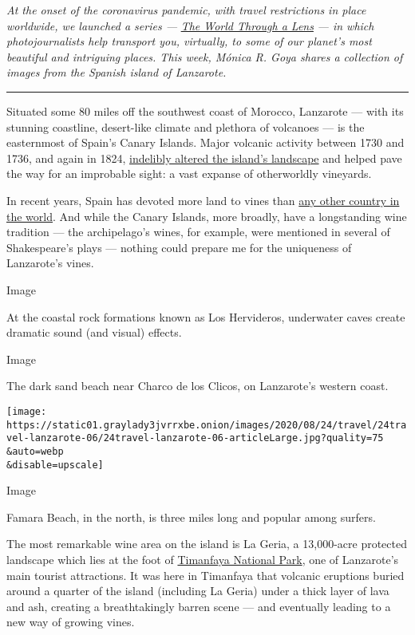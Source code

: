 \emph{At the onset of the coronavirus pandemic, with travel restrictions
in place worldwide, we launched a series ---}
\href{https://www.nytimes3xbfgragh.onion/column/the-world-through-a-lens}{\emph{The
World Through a Lens}} \emph{--- in which photojournalists help
transport you, virtually, to some of our planet's most beautiful and
intriguing places. This week, Mónica R. Goya shares a collection of
images from the Spanish island of Lanzarote.}

\begin{center}\rule{0.5\linewidth}{\linethickness}\end{center}

Situated some 80 miles off the southwest coast of Morocco, Lanzarote ---
with its stunning coastline, desert-like climate and plethora of
volcanoes --- is the easternmost of Spain's Canary Islands. Major
volcanic activity between 1730 and 1736, and again in 1824,
\href{http://volcano.oregonstate.edu/lanzarote\#:~:text=Lanzarote\%2C\%20a\%20shield\%20volcano\%20made,are\%20near\%20Montanas\%20del\%20Fuego.}{indelibly
altered the island's landscape} and helped pave the way for an
improbable sight: a vast expanse of otherworldly vineyards.

In recent years, Spain has devoted more land to vines than
\href{https://www.foodswinesfromspain.com/spanishfoodwine/wcm/idc/groups/public/documents/documento_anexo/mde3/nzcw/~edisp/dax2017770176.pdf}{any
other country in the world}. And while the Canary Islands, more broadly,
have a longstanding wine tradition --- the archipelago's wines, for
example, were mentioned in several of Shakespeare's plays --- nothing
could prepare me for the uniqueness of Lanzarote's vines.

Image

At the coastal rock formations known as Los Hervideros, underwater caves
create dramatic sound (and visual) effects.

Image

The dark sand beach near Charco de los Clicos, on Lanzarote's western
coast.

\texttt{[image: https://static01.graylady3jvrrxbe.onion/images/2020/08/24/travel/24travel-lanzarote-06/24travel-lanzarote-06-articleLarge.jpg?quality=75\\\&auto=webp\\\&disable=upscale]}

Image

Famara Beach, in the north, is three miles long and popular among
surfers.

The most remarkable wine area on the island is La Geria, a 13,000-acre
protected landscape which lies at the foot of
\href{https://turismolanzarote.com/en/visiting-the-timanfaya-national-park/}{Timanfaya
National Park}, one of Lanzarote's main tourist attractions. It was here
in Timanfaya that volcanic eruptions buried around a quarter of the
island (including La Geria) under a thick layer of lava and ash,
creating a breathtakingly barren scene --- and eventually leading to a
new way of growing vines.

